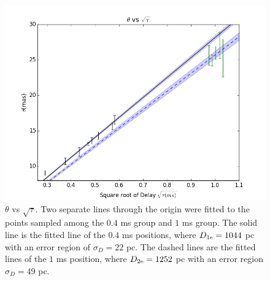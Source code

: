 \documentclass[useAMS,usenatbib]{mn2e}
\begin{document}

\begin{figure}
\centering
\includegraphics[width=1.0\linewidth, angle=0]{Theta_tau.png}
\caption{${\theta}$ vs ${\sqrt{\tau}}$. Two separate lines through the
  origin were fitted to the points sampled among the $0.4$ ms group
  and $1$ ms group. The solid line is the fitted line of the $0.4$ ms
  positions, where $D_{1\rm e}=1044$ pc with an error region of
  $\sigma_D=22$ pc. The dashed lines are the fitted lines of the $1$ ms
  position, where $D_{2\rm e}=1252$ pc with an error region
  $\sigma_D=49$ pc.
}
\label{thetatau}
\end{figure}
\end{document}
